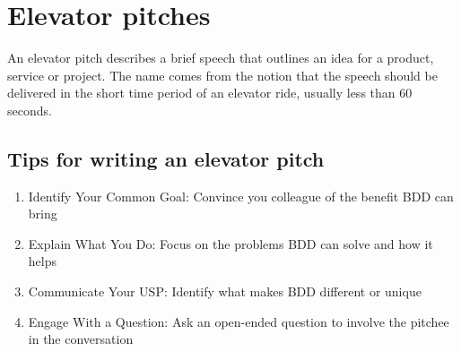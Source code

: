 \chapter*{Elevator pitches}

\begin{framed}
An elevator pitch describes a brief speech that outlines an idea for a product, service or project. The name comes from the notion that the speech should be delivered in the short time period of an elevator ride, usually less than 60 seconds.
\end{framed}

\section*{Tips for writing an elevator pitch}

\begin{enumerate}
    \item Identify Your Common Goal: Convince you colleague of the benefit BDD can bring
    \item Explain What You Do: Focus on the problems BDD can solve and how it helps
    \item Communicate Your USP: Identify what makes BDD different or unique
    \item Engage With a Question: Ask an open-ended question to involve the pitchee in the conversation
\end{enumerate}
